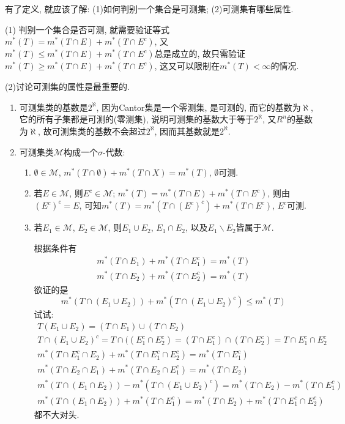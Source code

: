 \documentclass[12pt,a4paper,openany]{book}
\begin{document}
有了定义, 就应该了解: (1)如何判别一个集合是可测集; (2)可测集有哪些属性.

(1) 判别一个集合是否可测, 就需要验证等式$m^*(T) = m^*(T \cap E) + m^*(T \cap E^c)$, 又$m^*(T) \le m^*(T \cap E) + m^*(T \cap E^c)$总是成立的, 故只需验证$m^*(T) \ge m^*(T \cap E) + m^*(T \cap E^c)$, 这又可以限制在$m^*(T) < \infty$的情况.

(2)讨论可测集的属性是最重要的.
\begin{enumerate}
\item 可测集类的基数是$2^{\aleph}$, 因为Cantor集是一个零测集, 是可测的, 而它的基数为$\aleph$, 它的所有子集都是可测的(零测集), 说明可测集的基数大于等于$2^{\aleph}$, 又$R^n$的基数为$\aleph$, 故可测集类的基数不会超过$2^{\aleph}$, 因而其基数就是$2^{\aleph}$.

\item 可测集类$\mathcal{M}$构成一个$\sigma$-代数:
\begin{enumerate}
\item $\emptyset \in \mathcal{M}$, $m^*(T \cap \emptyset) + m^*(T \cap X) = m^*(T)$, $\emptyset$可测.
\item 若$E \in \mathcal{M}$, 则$E^c \in \mathcal{M}$; $m^*(T) = m^*(T \cap E) + m^*(T \cap E^c)$, 则由$(E^c)^c = E$, 可知$m^*(T) = m^*(T \cap (E^c)^c) + m^*(T \cap E^c)$, $E^c$可测.
\item 若$E_1 \in \mathcal{M}$, $E_2 \in \mathcal{M}$, 则$E_1 \cup E_2$, $E_1 \cap E_2$, 以及$E_1 \backslash E_2$皆属于$\mathcal{M}$.

根据条件有
\begin{gather*}
m^*(T \cap E_1) + m^*(T \cap E_1^c) = m^*(T)\\
m^*(T \cap E_2) + m^*(T \cap E_2^c) = m^*(T)
\end{gather*}
欲证的是
\[
m^*(T \cap (E_1 \cup E_2)) + m^*(T \cap (E_1 \cup E_2)^c) \le m^*(T)
\]
试试:
\begin{gather*}
T(E_1 \cup E_2) = (T \cap E_1) \cup (T \cap E_2) \\
T \cap (E_1 \cup E_2)^c = T \cap ((E_1^c \cap E_2^c) = (T \cap E_1^c) \cap (T \cap E_2^c) = T \cap E_1^c \cap E_2^c \\
m^*(T \cap E_1^c \cap E_2) + m^*(T \cap E_1^c \cap E_2^c) = m^*(T \cap E_1^c) \\
m^*(T \cap E_2 \cap E_1) + m^*(T \cap E_2 \cap E_1^c) = m^*(T \cap E_2) \\
m^*(T \cap (E_1 \cap E_2)) - m^*(T \cap (E_1 \cup E_2)^c) = m^*(T \cap E_2) - m^*(T \cap E_1^c) \\
m^*(T \cap (E_1 \cap E_2)) + m^*(T \cap E_1^c) = m^*(T \cap E_2) + m^*(T \cap E_1^c \cap E_2^c) 
\end{gather*}
都不大对头.


\end{enumerate}
\end{enumerate}
\end{document}
